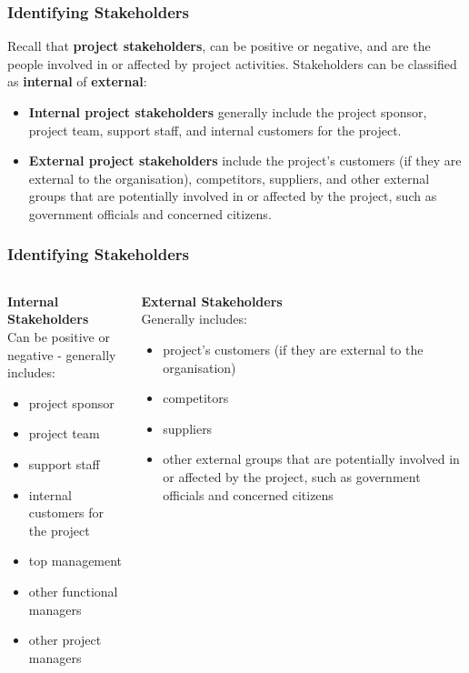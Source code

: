 \documentclass[aspectratio=169]{beamer}
\begin{document}
\begin{frame}
\frametitle{Identifying Stakeholders}
Recall that \textbf{project stakeholders}, can be positive or negative, and are the people involved in or affected by project activities. Stakeholders can be classified as \textbf{internal} of \textbf{external}:
\vspace{0.5cm}
\begin{itemize}
\item \textbf{Internal project stakeholders} generally include the project sponsor, project team, support staff, and internal customers for the project.
\item \textbf{External project stakeholders} include the project's customers (if they are external to the organisation), competitors, suppliers, and other external groups that are potentially involved in or affected by the project, such as government officials and concerned citizens.
\end{itemize}
\end{frame}

\begin{frame}
\frametitle{Identifying Stakeholders}
\begin{columns}[t]
\begin{tcolorbox}
\textbf{Internal Stakeholders}\\

\footnotesize Can be positive or negative - generally includes:
\begin{itemize}
\item project sponsor
\item project team
\item support staff
\item internal customers for the project
\item top management
\item other functional managers
\item other project managers
\end{itemize}
\end{tcolorbox}
\begin{tcolorbox}
\textbf{External Stakeholders}\\

\footnotesize Generally includes:
\begin{itemize}
\item project's customers (if they are external to the organisation)
\item competitors
\item suppliers
\item other external groups that are potentially involved in or affected by the project, such as government officials and concerned citizens
\end{itemize}
\end{tcolorbox}
\end{columns}
\end{frame}
\end{document}
